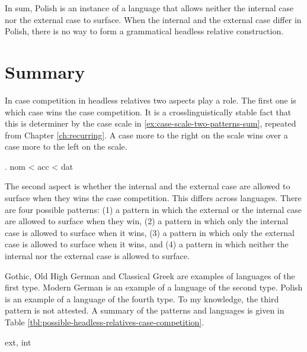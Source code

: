 In sum, Polish is an instance of a language that allows neither the internal case nor the external case to surface. When the internal and the external case differ in Polish, there is no way to form a grammatical headless relative construction.

\section{Summary}\label{sec:summary-2-patterns}

In case competition in headless relatives two aspects play a role. The first one is which case wins the case competition. It is a crosslinguistically stable fact that this is determiner by the case scale in \ref{ex:case-scale-two-patterns-sum}, repeated from Chapter \ref{ch:recurring}. A case more to the right on the scale wins over a case more to the left on the scale.

\ex. \ac{nom} < \ac{acc} < \ac{dat}\label{ex:case-scale-two-patterns-sum}

The second aspect is whether the internal and the external case are allowed to surface when they wins the case competition. This differs across languages. There are four possible patterns: (1) a pattern in which the external or the internal case are allowed to surface when they win, (2) a pattern in which only the internal case is allowed to surface when it wins, (3) a pattern in which only the external case is allowed to surface when it wins, and (4) a pattern in which neither the internal nor the external case is allowed to surface.

Gothic, Old High German and Classical Greek are examples of languages of the first type. Modern German is an example of a language of the second type. Polish is an example of a language of the fourth type. To my knowledge, the third pattern is not attested. A summary of the patterns and languages is given in Table \ref{tbl:possible-headless-relatives-case-competition}.

\ac{ext}, \ac{int}

